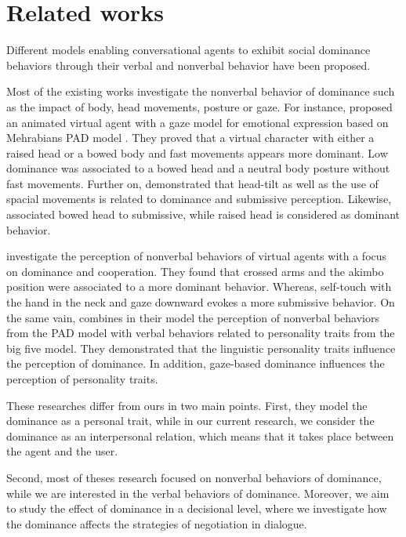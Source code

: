 \documentclass{llncs}
\begin{document}
	\section{Related works}
	Different models enabling conversational agents to exhibit social dominance behaviors through their verbal and nonverbal behavior have been proposed. 
	
	Most of the existing works investigate the nonverbal behavior of dominance such as the impact of body, head movements, posture or gaze. For instance, \cite{lance2008relation}  proposed an animated virtual agent with a gaze model for emotional expression based on Mehrabians PAD model \cite{mehrabian1996analysis}. They proved that a virtual character with either a raised head or a bowed body and fast movements appears more dominant. Low dominance was associated to a bowed head and a neutral body posture without fast movements.	Further on,	 \cite{gebhard2014exploring,callejas2014computational} demonstrated that head-tilt as well as the use of spacial movements is related to dominance and submissive perception. Likewise, \cite{mignault2003many} associated bowed head to submissive, while raised head is considered as dominant behavior.
	
	\par \cite{strassmann2016effect} investigate the perception of nonverbal behaviors of virtual agents with a focus on dominance and cooperation. They found that crossed arms and the akimbo position were associated to a more dominant behavior. Whereas, self-touch with the hand in the neck and gaze downward evokes a more submissive behavior. On the same vain,  \cite{bee2010bossy} combines in their model the perception of nonverbal behaviors from the PAD model \cite{mehrabian1996analysis} with verbal behaviors related to personality traits from the big five model. They demonstrated that the linguistic personality traits influence the perception of dominance. In addition, gaze-based dominance influences the perception of personality traits.
	
	These researches differ from ours in two main points. First, they model the dominance as a personal trait, while in our current research, we consider the dominance as an interpersonal relation, which means that it takes place between the agent and the user. 
	
	Second, most of theses research focused on nonverbal behaviors of dominance, while we are interested in the verbal behaviors of dominance. Moreover, we aim to study the effect of dominance in a decisional level, where we investigate how the dominance affects the strategies of negotiation in dialogue.
	
\end{document}
